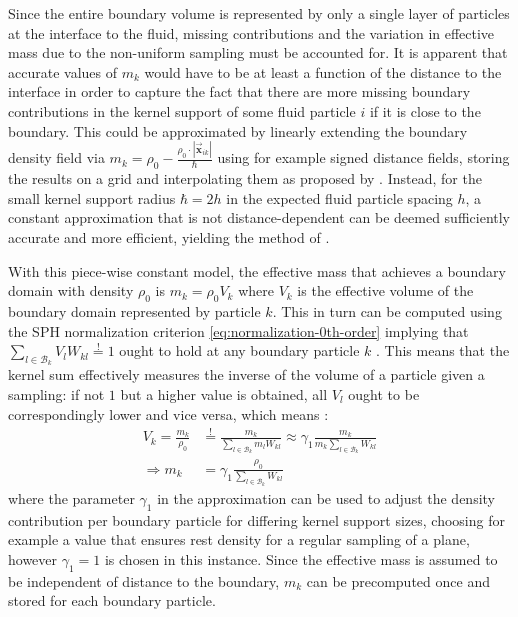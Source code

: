 \documentclass[oneside, a4paper]{book}
\newcommand\abs[1]{\left|#1\right|}
\newcommand\vek[1]{\vec{\bm{#1}}}
\begin{document}
    Since the entire boundary volume is represented by only a single layer of particles at the interface to the fluid, missing contributions and the variation in effective mass due to the non-uniform sampling must be accounted for. It is apparent that accurate values of $m_k$ would have to be at least a function of the distance to the interface in order to capture the fact that there are more missing boundary contributions in the kernel support of some fluid particle $i$ if it is close to the boundary. This could be approximated by linearly extending the boundary density field via $m_k = \rho_0 - \frac{\rho_0\cdot \abs{\vek{x}_{ik}}}{\hbar}$ using for example signed distance fields, storing the results on a grid and interpolating them as proposed by \autocite[Koshier and Bender]{density-maps}. Instead, for the small kernel support radius $\hbar=2h$ in the expected fluid particle spacing $h$, a constant approximation that is not distance-dependent can be deemed sufficiently accurate and more efficient, yielding the method of \autocite[Akinci et al.]{versatile-boundary-akinci}.

    With this piece-wise constant model, the effective mass that achieves a boundary domain with density $\rho_0$ is $m_k = \rho_0V_k$ where $V_k$ is the effective volume of the boundary domain represented by particle $k$. This in turn can be computed using the SPH normalization criterion \autoref{eq:normalization-0th-order} implying that $\sum_{l\in\mathcal{B}_k} V_l W_{kl}\overset{!}{=} 1$ ought to hold at any boundary particle $k$ \autocite{versatile-boundary-akinci}. This means that the kernel sum effectively measures the inverse of the volume of a particle given a sampling: if not $1$ but a higher value is obtained, all $V_l$ ought to be correspondingly lower and vice versa, which means \autocite{versatile-boundary-akinci}: 
    \begin{align}
      V_k = \frac{m_k}{\rho_0} &\overset{!}{=} \frac{m_k}{\sum_{l\in\mathcal{B}_k} m_l W_{kl}} \approx \gamma_1 \frac{ m_k}{m_k \sum_{l\in\mathcal{B}_k} W_{kl}}\label{eq:boundary-mass-approximation}\\
      \Longrightarrow m_k &= \gamma_1 \frac{\rho_0}{\sum_{l\in\mathcal{B}_k} W_{kl}}\label{eq:boundary-mass-calculation}
    \end{align}
    where the parameter $\gamma_1$ in the approximation can be used to adjust the density contribution per boundary particle for differing kernel support sizes, choosing for example a value that ensures rest density for a regular sampling of a plane, however $\gamma_1=1$ is chosen in this instance. 
    Since the effective mass is assumed to be independent of distance to the boundary, $m_k$ can be precomputed once and stored for each boundary particle.
    
\end{document}
